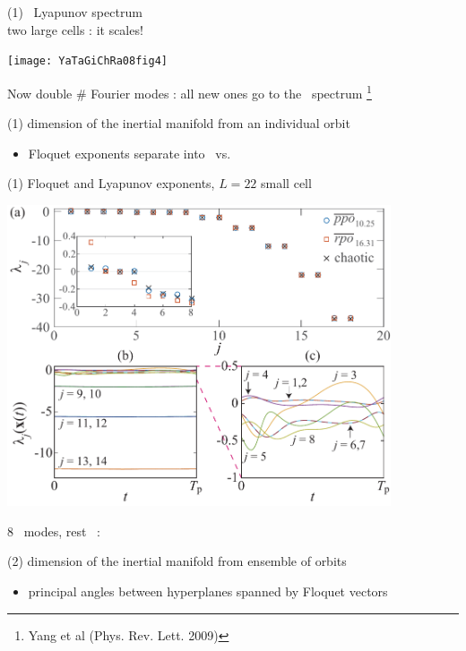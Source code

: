 \begin{frame}{(1) \KS\ Lyapunov spectrum \\ two large cells : it scales!}
\begin{center}
\texttt{[image: YaTaGiChRa08fig4]}
\end{center}

Now double \# Fourier modes : all new ones go to the \transient\ spectrum
\footnote{\footnotesize
Yang et al (Phys. Rev. Lett. 2009)}
\end{frame}

\begin{frame}{(1) dimension of the inertial manifold from an individual orbit}

\bigskip

\begin{itemize}
  \item Floquet exponents separate into \entangled\ vs. \transient
\end{itemize}
\end{frame}


\begin{frame}{(1) Floquet and Lyapunov exponents, $L=22$ small cell}
\begin{center}
\includegraphics[width=0.85\textwidth]{../../dimension/ks22FloqExp}
\end{center}
8 \entangled\ modes, rest \transient\  :

\hfill \color{red}{inertial manifold is 8 dimensional!}
\end{frame}

\begin{frame}{(2) dimension of the inertial manifold from ensemble of orbits}

\bigskip

\begin{itemize}
  \item principal angles between hyperplanes spanned by Floquet vectors
\end{itemize}
\end{frame}

